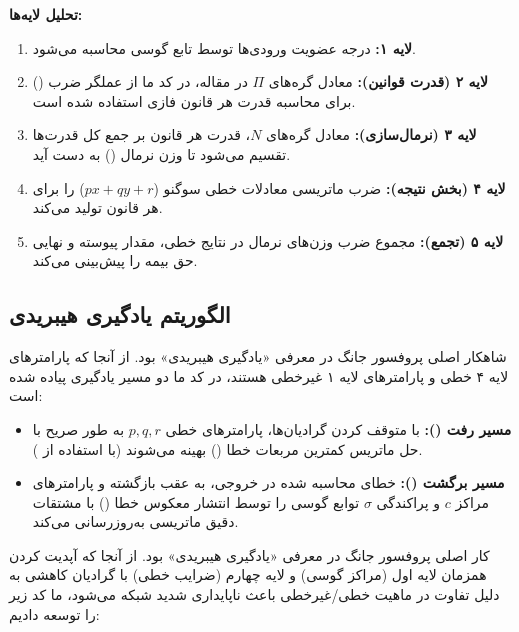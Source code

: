 \documentclass{article}
\begin{document}
	\textbf{تحلیل لایه‌ها:}
	\begin{enumerate}
		\item \textbf{لایه ۱:} درجه عضویت ورودی‌ها توسط تابع گوسی محاسبه می‌شود.
		\item \textbf{لایه ۲ (قدرت قوانین):} معادل گره‌های $\Pi$ در مقاله، در کد ما از عملگر ضرب () برای محاسبه قدرت هر قانون فازی استفاده شده است.
		\item \textbf{لایه ۳ (نرمال‌سازی):} معادل گره‌های $N$، قدرت هر قانون بر جمع کل قدرت‌ها تقسیم می‌شود تا وزن نرمال () به دست آید.
		\item \textbf{لایه ۴ (بخش نتیجه):} ضرب ماتریسی  معادلات خطی سوگنو ($p x + q y + r$) را برای هر قانون تولید می‌کند.
		\item \textbf{لایه ۵ (تجمع):} مجموع ضرب وزن‌های نرمال در نتایج خطی، مقدار پیوسته و نهایی حق بیمه را پیش‌بینی می‌کند.
	\end{enumerate}
	
	\subsection{الگوریتم یادگیری هیبریدی }
	شاهکار اصلی پروفسور جانگ در معرفی «یادگیری هیبریدی» بود. از آنجا که پارامترهای لایه ۴ خطی و پارامترهای لایه ۱ غیرخطی هستند، در کد ما دو مسیر یادگیری پیاده شده است:
	\begin{itemize}
		\item \textbf{مسیر رفت ():} با متوقف کردن گرادیان‌ها، پارامترهای خطی $p, q, r$ به طور صریح با حل ماتریس کمترین مربعات خطا () بهینه می‌شوند (با استفاده از ).
		\item \textbf{مسیر برگشت ():} خطای محاسبه شده در خروجی، به عقب بازگشته و پارامترهای مراکز $c$ و پراکندگی $\sigma$ توابع گوسی را توسط انتشار معکوس خطا () با مشتقات دقیق ماتریسی به‌روزرسانی می‌کند.
	\end{itemize}
	کار اصلی پروفسور جانگ در معرفی «یادگیری هیبریدی» بود. از آنجا که آپدیت کردن همزمان لایه اول (مراکز گوسی) و لایه چهارم (ضرایب خطی) با گرادیان کاهشی به دلیل تفاوت در ماهیت خطی/غیرخطی باعث ناپایداری شدید شبکه می‌شود، ما کد زیر را توسعه دادیم:
	
\end{document}
